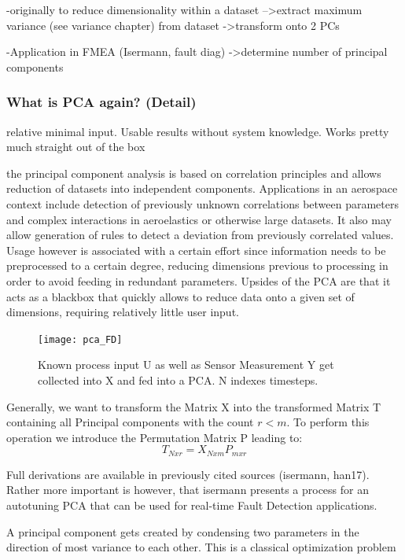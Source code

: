 -originally to reduce dimensionality within a dataset \cite{handl_multivariate_2017}
-->extract maximum variance (see variance chapter) from dataset
->transform onto 2 PCs

-Application in FMEA (Isermann, fault diag) \cite{isermann_fault-diagnosis_2006}
->determine number of principal components

\subsubsection{What is PCA again? (Detail)}

relative minimal input. Usable results without system knowledge. Works pretty much straight out of the box

the principal component analysis is based on correlation principles and allows reduction of datasets into independent components. Applications in an aerospace context include detection of previously unknown correlations between parameters and complex interactions in aeroelastics or otherwise large datasets. It also may allow generation of rules to detect a deviation from previously correlated values. Usage however is associated with a certain effort since information needs to be preprocessed to a certain degree, reducing dimensions previous to processing in order to avoid feeding in redundant parameters. Upsides of the PCA are that it acts as a blackbox that quickly allows to reduce data onto a given set of dimensions, requiring relatively little user input.


\begin{figure}
    \centering
    \texttt{[image: pca\_FD]}
    \caption{Known process input U as well as Sensor Measurement Y get collected into X and fed into a PCA. N indexes timesteps.\cite[p.268]{isermann_fault-diagnosis_2006}}
    \label{fig:pca_FD}
\end{figure}



Generally, we want to transform the Matrix X into the transformed Matrix T containing all Principal components with the count $r<m$. To perform this operation we introduce the Permutation Matrix P leading to:
$$T_{Nxr} = X_{Nxm}  P_{mxr}$$

Full derivations are available in previously cited sources (isermann, han17). Rather more important is however, that isermann presents a process for an autotuning PCA that can be used for real-time Fault Detection applications.


A principal component gets created by condensing two parameters in the direction of most variance to each other. This is a classical optimization problem


